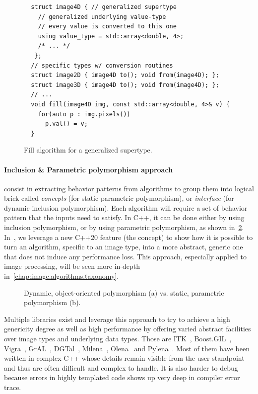 \begin{figure}[tbh]
  \centering
  \begin{verbatim}
  struct image4D { // generalized supertype
    // generalized underlying value-type
    // every value is converted to this one
    using value_type = std::array<double, 4>;
    /* ... */
   };
  // specific types w/ conversion routines
  struct image2D { image4D to(); void from(image4D); };
  struct image3D { image4D to(); void from(image4D); };
  // ...
  void fill(image4D img, const std::array<double, 4>& v) {
    for(auto p : img.pixels())
      p.val() = v;
  }
  \end{verbatim}
  \caption{Fill algorithm for a generalized supertype.}
  \label{code:gen.generalized}
\end{figure}

\paragraph{Inclusion \& Parametric polymorphism approach} consist in extracting behavior patterns from algorithms to
group them into logical brick called \emph{concepts} (for static parametric polymorphism), or \emph{interface} (for
dynamic inclusion polymorphism). Each algorithm will require a set of behavior pattern that the inputs need to satisfy.
In C++, it can be done either by using inclusion polymorphism, or by using parametric polymorphism, as shown
in~\ref{code:gen.inclupoly}. In~\cite{roynard.2019.rrpr}, we leverage a new C++20 feature (the concept) to show how it
is possible to turn an algorithm, specific to an image type, into a more abstract, generic one that does not induce any
performance loss. This approach, especially applied to image processing, will be seen more in-depth
in~\cref{chap:image.algorithms.taxonomy}.

\begin{figure}[htb]
  \centering
  \hfil
  \vfil
  \hfil
  \caption{Dynamic, object-oriented polymorphism (a) vs. static, parametric polymorphism (b).}
  \label{code:gen.inclupoly}
\end{figure}

Multiple libraries exist and leverage this approach to try to achieve a high genericity degree as well as high
performance by offering varied abstract facilities over image types and underlying data types. Those are
ITK~\cite{johnson.2013.ITKSoftwareGuideThirdEdition}, Boost.GIL~\cite{bourdev.2006.bgil},
Vigra~\cite{kothe.2011.generic}, GrAL~\cite{berti.2006.gral}, DGTal~\cite{coeurjolly.2016.dgtal},
Milena~\cite{levillain.2009.ismm,levillain.2010.icip},
Olena~\cite{olena.2000.www,levillain.2011.phd,geraud.2012.hdr,levillain.2014.ciarp} and
Pylena~\cite{carlinet.2018.pylena}. Most of them have been written in complex C++ whose details remain visible from the
user standpoint and thus are often difficult and complex to handle. It is also harder to debug because errors in highly
templated code shows up very deep in compiler error trace.

